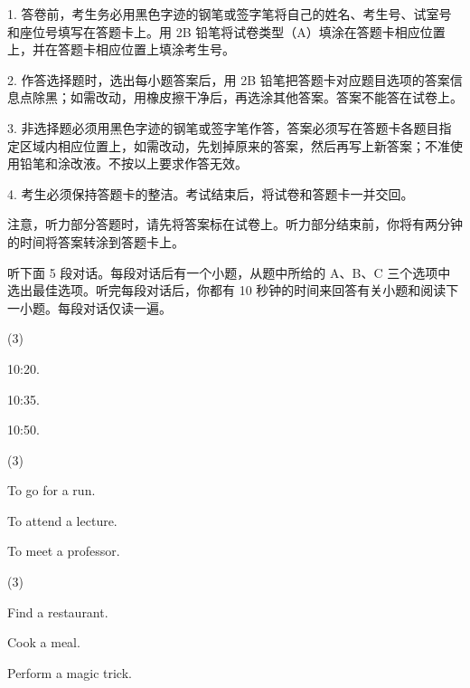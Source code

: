 \documentclass{英语试卷}
\begin{document}
\begin{notice}
\par 1. 答卷前，考生务必用黑色字迹的钢笔或签字笔将自己的姓名、考生号、试室号和座位号填写在答题卡上。用 2B 铅笔将试卷类型（A）填涂在答题卡相应位置上，并在答题卡相应位置上填涂考生号。\par
\par 2. 作答选择题时，选出每小题答案后，用 2B 铅笔把答题卡对应题目选项的答案信息点除黑；如需改动，用橡皮擦干净后，再选涂其他答案。答案不能答在试卷上。\par
\par 3. 非选择题必须用黑色字迹的钢笔或签字笔作答，答案必须写在答题卡各题目指定区域内相应位置上，如需改动，先划掉原来的答案，然后再写上新答案；不准使用铅笔和涂改液。不按以上要求作答无效。\par
\par 4. 考生必须保持答题卡的整洁。考试结束后，将试卷和答题卡一并交回。\par
\end{notice}
\par 注意，听力部分答题时，请先将答案标在试卷上。听力部分结束前，你将有两分钟的时间将答案转涂到答题卡上。\par
{}
\par 听下面 5 段对话。每段对话后有一个小题，从题中所给的 A、B、C 三个选项中选出最佳选项。听完每段对话后，你都有 10 秒钟的时间来回答有关小题和阅读下一小题。每段对话仅读一遍。\par
{}
\begin{choices}(3)
  \item 10:20.
  \item 10:35.
  \item 10:50.
\end{choices}
\begin{choices}(3)
  \item To go for a run.
  \item To attend a lecture.
  \item To meet a professor.
\end{choices}
\begin{choices}(3)
  \item Find a restaurant.
  \item Cook a meal.
  \item Perform a magic trick.
\end{choices}
\end{document}
